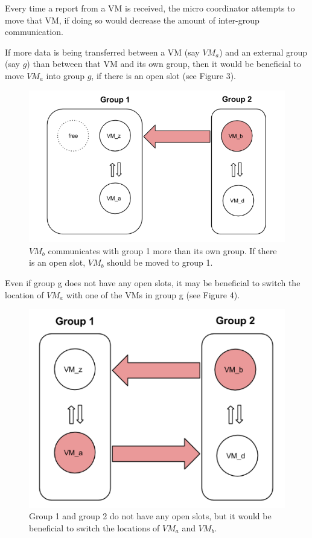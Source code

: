\documentclass[11pt]{article}
\begin{document}
Every time a report from a VM is received, the micro coordinator attempts to move that VM, if doing so would decrease the amount of inter-group communication.

If more data is being transferred between a VM (say $VM_a$) and an external group (say $g$) than between that VM and its own group, then it would be beneficial to move $VM_a$ into group $g$, if there is an open slot (see Figure 3).

\begin{figure}
  \centering
\includegraphics[scale=0.65]{micro1.png}

 \caption{$VM_b$ communicates with group 1 more than its own group.  If there is an open slot, $VM_b$ should be moved to group 1.}
 
\end{figure}

Even if group g does not have any open slots, it may be beneficial to switch the location of $VM_a$ with one of the VMs in group g (see Figure 4).
\begin{figure}
  \centering
\includegraphics[scale=0.65]{micro2.png}

 \caption{Group 1 and group 2 do not have any open slots, but it would be beneficial to switch the locations of $VM_a$ and $VM_b$.}
 
\end{figure}
\end{document}
